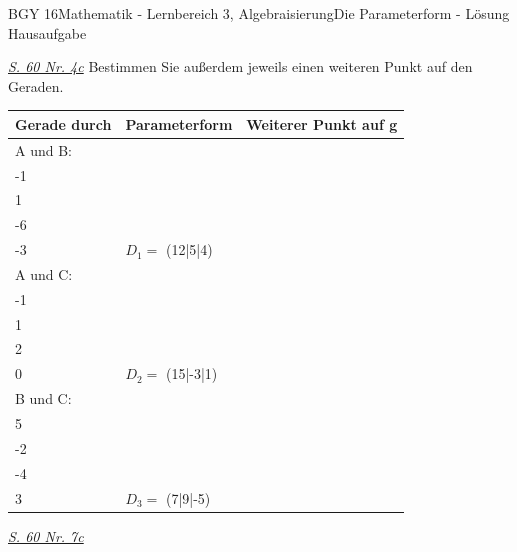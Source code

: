 \documentclass[oneside,openany,headings=optiontotoc,11pt,numbers=noenddot]{scrreprt}
\begin{document}
\begin{worksheet}{BGY 16}{Mathematik - Lernbereich 3, Algebraisierung}{Die Parameterform - Lösung Hausaufgabe}
		\begin{framed}
			\noindent
			\underline{\textit{S. 60 Nr. 4c}} Bestimmen Sie außerdem jeweils einen weiteren Punkt auf den Geraden.\\
			\par\noindent
			\begin{tabularx}{\textwidth}{lXX}
				Gerade durch & Parameterform & Weiterer Punkt auf g\\
				\hline
				A und B:&\(g: \vec{x} = \left(\begin{array}{c}8\\-1\\1\end{array}\right) + r*\left(\begin{array}{c}-4\\-6\\-3\end{array}\right)\) & \(D_1 =\) (12|5|4)\\
				A und C:&\(g: \vec{x} = \left(\begin{array}{c}8\\-1\\1\end{array}\right) + r*\left(\begin{array}{c}-7\\2\\0\end{array}\right)\) & \(D_2 =\) (15|-3|1)\\
				B und C:&\(g: \vec{x} = \left(\begin{array}{c}4\\5\\-2\end{array}\right) + r*\left(\begin{array}{c}-3\\-4\\3\end{array}\right)\)& \(D_3 =\) (7|9|-5)\\
			\end{tabularx}
			\newpage\noindent		
			\underline{\textit{S. 60 Nr. 7c}}\\
			\par\noindent

\end{framed}
\end{worksheet}
\end{document}
